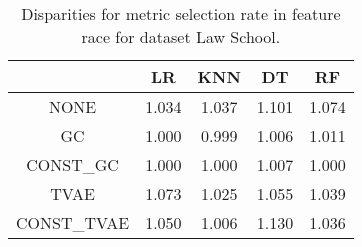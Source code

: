 \begin{table}
\caption{Disparities for metric selection rate in feature race for dataset Law School.}
\label{tab:disp-LAW SCHOOL-race-selection_rate}
\begin{tabular}{ccccc}
\toprule
 & LR & KNN & DT & RF \\
\midrule
NONE & 1.034 & 1.037 & 1.101 & 1.074 \\
GC & 1.000 & 0.999 & 1.006 & 1.011 \\
CONST\_GC & 1.000 & 1.000 & 1.007 & 1.000 \\
TVAE & 1.073 & 1.025 & 1.055 & 1.039 \\
CONST\_TVAE & 1.050 & 1.006 & 1.130 & 1.036 \\
\bottomrule
\end{tabular}
\end{table}
